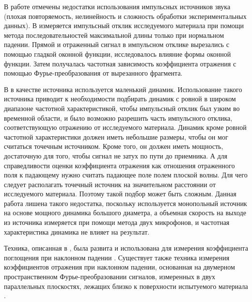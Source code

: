 В работе \cite{Garai1993} отмечены недостатки использования импульсных источников звука (плохая повторяемость, нелинейность и сложность обработки экспериментальных данных). В \cite{Garai1993} измеряется импульсный отклик исследуемого материала при помощи метода последовательностей максимальной длины только при нормальном падении. Прямой и отраженный сигнал в импульсном отклике вырезались с помощью гладкой оконной функции, исследовалось влияние формы оконной функции. Затем получалась частотная зависимость коэффициента отражения с помощью Фурье-преобразования от вырезанного фрагмента. 

В \cite{Garai1993} в качестве источника используется маленький динамик. Использование такого источника приводит к необходимости подбирать динамик с ровной в широком диапазоне частотной характеристикой, чтобы импульсный отклик был узким во временной области, и было возможно разрешить часть импульсного отклика, соответствующую отражению от исследуемого материала. Динамик кроме ровной частотной характеристики должен иметь небольшие размеры, чтобы он мог считаться точечным источником. Кроме того, он должен иметь мощность, достаточную для того, чтобы сигнал не затух по пути до приемника. А для справедливости оценки коэффициента отражения как отношения отраженного поля к падающему нужно считать падающее поле полем плоской волны. Для чего следует располагать точечный источник на значительном расстоянии от исследуемого материала. Поэтому такой подбор может быть сложным. Данная работа лишена такого недостатка, поскольку используется монопольный источник на основе мощного динамика большого диаметра, а объемная скорость на выходе из источника измеряется при помощи метода двух микрофонов, и частотная характеристика динамика не влияет на результат. 
	
Техника, описанная в \cite{Garai1993}, была развита и использована для измерения коэффициента поглощения при наклонном падении \cite{Mommertz1995}. Существует также техника измерения коэффициентов отражения при наклонном падении, основанная на двумерном пространственном Фурье-преобразовании сигналов, измеренных в двух параллельных плоскостях, лежащих близко к поверхности испытуемого материала \cite{Tamura1990I, Tamura1990II}. 
	
